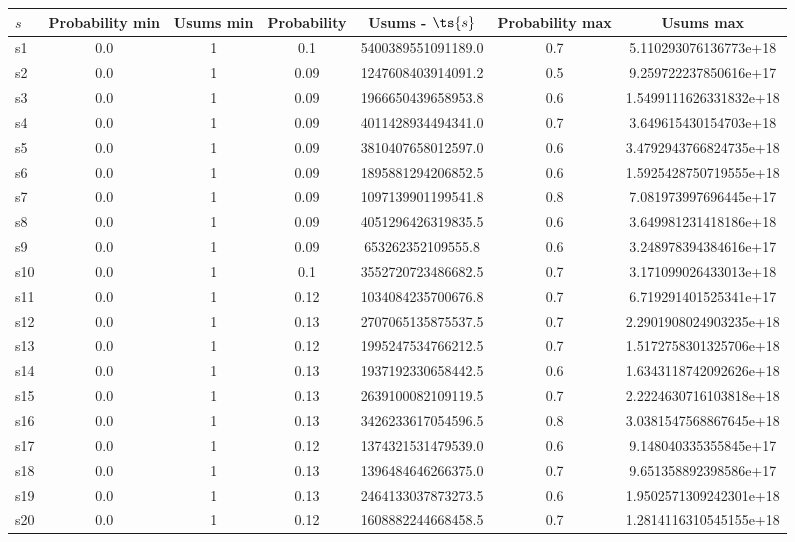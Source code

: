 \documentclass{article}
\begin{document}
\noindent\begin{tabular}{|l|c|c|c|c|c|c|}
\hline
$s$& Probability min & Usums min & Probability & Usums - $\ts{s}$ & Probability max & Usums max\\
\hline
s1 &0.0 & 1 & 0.1 & 5400389551091189.0 & 0.7 & 5.110293076136773e+18\\
\hline
s2 &0.0 & 1 & 0.09 & 1247608403914091.2 & 0.5 & 9.259722237850616e+17\\
\hline
s3 &0.0 & 1 & 0.09 & 1966650439658953.8 & 0.6 & 1.5499111626331832e+18\\
\hline
s4 &0.0 & 1 & 0.09 & 4011428934494341.0 & 0.7 & 3.649615430154703e+18\\
\hline
s5 &0.0 & 1 & 0.09 & 3810407658012597.0 & 0.6 & 3.4792943766824735e+18\\
\hline
s6 &0.0 & 1 & 0.09 & 1895881294206852.5 & 0.6 & 1.5925428750719555e+18\\
\hline
s7 &0.0 & 1 & 0.09 & 1097139901199541.8 & 0.8 & 7.081973997696445e+17\\
\hline
s8 &0.0 & 1 & 0.09 & 4051296426319835.5 & 0.6 & 3.649981231418186e+18\\
\hline
s9 &0.0 & 1 & 0.09 & 653262352109555.8 & 0.6 & 3.248978394384616e+17\\
\hline
s10 &0.0 & 1 & 0.1 & 3552720723486682.5 & 0.7 & 3.171099026433013e+18\\
\hline
s11 &0.0 & 1 & 0.12 & 1034084235700676.8 & 0.7 & 6.719291401525341e+17\\
\hline
s12 &0.0 & 1 & 0.13 & 2707065135875537.5 & 0.7 & 2.2901908024903235e+18\\
\hline
s13 &0.0 & 1 & 0.12 & 1995247534766212.5 & 0.7 & 1.5172758301325706e+18\\
\hline
s14 &0.0 & 1 & 0.13 & 1937192330658442.5 & 0.6 & 1.6343118742092626e+18\\
\hline
s15 &0.0 & 1 & 0.13 & 2639100082109119.5 & 0.7 & 2.2224630716103818e+18\\
\hline
s16 &0.0 & 1 & 0.13 & 3426233617054596.5 & 0.8 & 3.0381547568867645e+18\\
\hline
s17 &0.0 & 1 & 0.12 & 1374321531479539.0 & 0.6 & 9.148040335355845e+17\\
\hline
s18 &0.0 & 1 & 0.13 & 1396484646266375.0 & 0.7 & 9.651358892398586e+17\\
\hline
s19 &0.0 & 1 & 0.13 & 2464133037873273.5 & 0.6 & 1.9502571309242301e+18\\
\hline
s20 &0.0 & 1 & 0.12 & 1608882244668458.5 & 0.7 & 1.2814116310545155e+18\\

\end{tabular}
\end{document}
